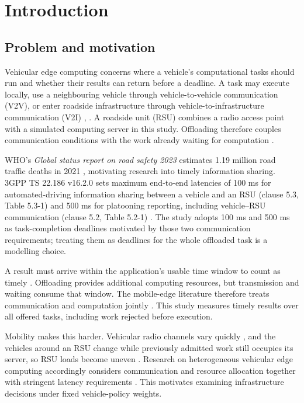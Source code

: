 \documentclass[12pt,a4paper]{article}
\begin{document}
\section{Introduction}\label{sec:1}

\FloatBarrier
\subsection{Problem and motivation}\label{sec:1.1}

Vehicular edge computing concerns where a vehicle's computational tasks should run and whether their results can return before a deadline. A task may execute locally, use a neighbouring vehicle through vehicle-to-vehicle communication (V2V), or enter roadside infrastructure through vehicle-to-infrastructure communication (V2I) \cite{ref1}, \cite{ref2}. A roadside unit (RSU) combines a radio access point with a simulated computing server in this study. Offloading therefore couples communication conditions with the work already waiting for computation \cite{ref3}.

WHO's \emph{Global status report on road safety 2023} estimates 1.19 million road traffic deaths in 2021 \cite{ref43}, motivating research into timely information sharing. 3GPP TS 22.186 v16.2.0 sets maximum end-to-end latencies of 100 ms for automated-driving information sharing between a vehicle and an RSU (clause 5.3, Table 5.3-1) and 500 ms for platooning reporting, including vehicle--RSU communication (clause 5.2, Table 5.2-1) \cite{ref42}. The study adopts 100 ms and 500 ms as task-completion deadlines motivated by those two communication requirements; treating them as deadlines for the whole offloaded task is a modelling choice.

A result must arrive within the application's usable time window to count as timely \cite{ref4}. Offloading provides additional computing resources, but transmission and waiting consume that window. The mobile-edge literature therefore treats communication and computation jointly \cite{ref3}. This study measures timely results over all offered tasks, including work rejected before execution.

Mobility makes this harder. Vehicular radio channels vary quickly \cite{ref5}, and the vehicles around an RSU change while previously admitted work still occupies its server, so RSU loads become uneven \cite{ref7}. Research on heterogeneous vehicular edge computing accordingly considers communication and resource allocation together with stringent latency requirements \cite{ref6}. This motivates examining infrastructure decisions under fixed vehicle-policy weights.
\end{document}
